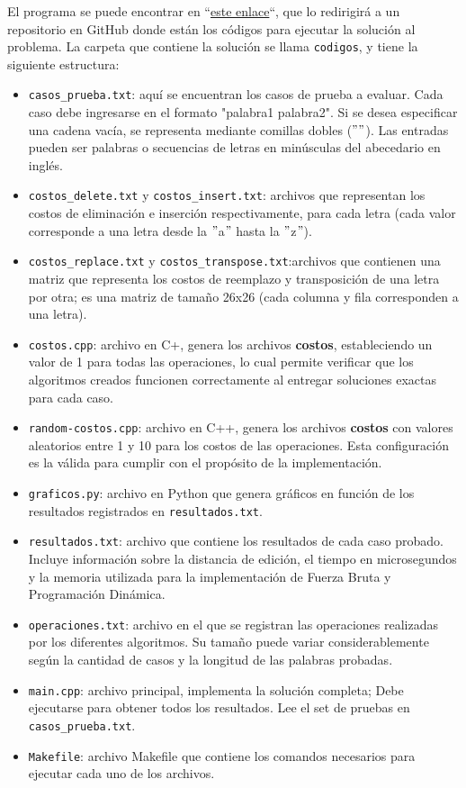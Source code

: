 El programa se puede encontrar en ``\href{https://github.com/luphin/Tarea2y3Algoritmos-FB-PD/tree/main}{este enlace}``, que lo redirigirá a un repositorio en GitHub donde están los códigos para ejecutar la solución al problema.
La carpeta que contiene la solución se llama \texttt{codigos}, y tiene la siguiente estructura:

\begin{itemize}
    \item \verb|casos_prueba.txt|: aquí se encuentran los casos de prueba a evaluar. Cada caso debe ingresarse en el formato "palabra1 palabra2". Si se desea especificar una cadena vacía, se representa mediante comillas dobles ($""$). Las entradas pueden ser palabras o secuencias de letras en minúsculas del abecedario en inglés. 
    \item \verb|costos_delete.txt| y \verb|costos_insert.txt|: archivos que representan los costos de eliminación e inserción respectivamente, para cada letra (cada valor corresponde a una letra desde la $"$a$"$ hasta la $"$z$"$).
    \item \verb|costos_replace.txt| y \verb|costos_transpose.txt|:archivos que contienen una matriz que representa los costos de reemplazo y transposición de una letra por otra; es una matriz de tamaño 26x26 (cada columna y fila corresponden a una letra).
    \item \verb|costos.cpp|: archivo en C+, genera los archivos \textbf{costos}, estableciendo un valor de 1 para todas las operaciones, lo cual permite verificar que los algoritmos creados funcionen correctamente al entregar soluciones exactas para cada caso.
    \item \verb|random-costos.cpp|: archivo en C++, genera los archivos \textbf{costos} con valores aleatorios entre 1 y 10 para los costos de las operaciones. Esta configuración es la válida para cumplir con el propósito de la implementación.
    \item \verb|graficos.py|: archivo en Python que genera gráficos en función de los resultados registrados en \verb|resultados.txt|.
    \item \verb|resultados.txt|: archivo que contiene los resultados de cada caso probado. Incluye información sobre la distancia de edición, el tiempo en microsegundos y la memoria utilizada para la implementación de Fuerza Bruta y Programación Dinámica.
    \item \verb|operaciones.txt|: archivo en el que se registran las operaciones realizadas por los diferentes algoritmos. Su tamaño puede variar considerablemente según la cantidad de casos y la longitud de las palabras probadas.
    \item \verb|main.cpp|: archivo principal, implementa la solución completa; Debe ejecutarse para obtener todos los resultados. Lee el set de pruebas en \verb|casos_prueba.txt|.
    \item \verb|Makefile|: archivo Makefile que contiene los comandos necesarios para ejecutar cada uno de los archivos.
\end{itemize}


